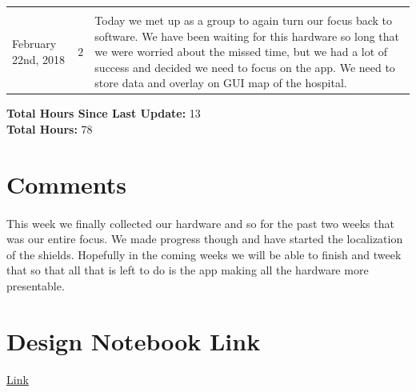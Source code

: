 \documentclass[11pt]{report}
\begin{document}
\begin{center}
{{\begin{tabular}{m{4cm} m{2cm} m{10cm}}
		&&\\
		February 22nd, 2018 & $2$ & Today we met up as a group to again turn our focus back to software. We have been waiting for this hardware so long that we were worried about the missed time, but we had a lot of success and decided we need to focus on the app. We need to store data and overlay on GUI map of the hospital.\\
		\end{tabular}
		}
		}
	\end{center}
		\textbf{Total Hours Since Last Update: } 13\\
		\textbf{Total Hours: } 78

\section*{Comments}
	\paragraph*{}
		This week we finally collected our hardware and so for the past two weeks that was our entire focus. We made progress though and have started the localization of the shields. Hopefully in the coming weeks we will be able to finish and tweek that so that all that is left to do is the app making all the hardware more presentable.

\section*{Design Notebook Link}
	\begin{center}
		\href{https://docs.google.com/document/d/1_15R62LK1jZ8SYRuCrb-5IObISIdbLSfoH2bRU7464c/edit?usp=sharing}{Link}
	\end{center}
\end{document}
